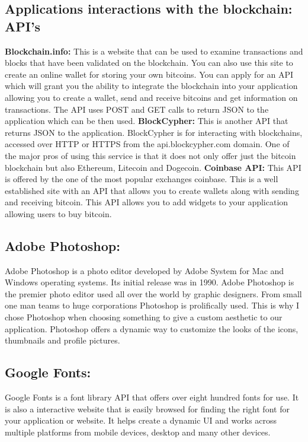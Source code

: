 \subsection{Applications interactions with the blockchain: API's}
\textbf{Blockchain.info:} This is a website that can be used to examine transactions and blocks that have been validated on the blockchain. You can also use this site to create an online wallet for storing your own bitcoins. You can apply for an API which will grant you the ability to integrate the blockchain into your application allowing you to create a wallet, send and receive bitcoins and get information on transactions. The API uses POST and GET calls to return JSON to the application which can be then used. \break
\textbf{BlockCypher:} This is another API that returns JSON to the application. BlockCypher is for interacting with blockchains, accessed over HTTP or HTTPS from the api.blockcypher.com domain. One of the major pros of using this service is that it does not only offer just the bitcoin blockchain but also Ethereum, Litecoin and Dogecoin. \break
\textbf{Coinbase API:} This API is offered by the one of the most popular exchanges coinbase. This is a well established site with an API that allows you to create wallets along with sending and receiving bitcoin. This API allows you to add widgets to your application allowing users to buy bitcoin.

\subsection{Adobe Photoshop:}
Adobe Photoshop is a photo editor developed by Adobe System for Mac and Windows operating systems. Its initial release was in 1990. Adobe Photoshop is the premier photo editor used all over the world by graphic designers. From small one man teams to huge corporations Photoshop is prolifically used. This is why I chose Photoshop when choosing something to give a custom aesthetic to our application. Photoshop offers a dynamic way to customize the looks of the icons, thumbnails and profile pictures. 

\subsection{Google Fonts:}
Google Fonts is a font library API that offers over eight hundred fonts for use. It is also a interactive website that is easily browsed for finding the right font for your application or website. It helps create a dynamic UI and works across multiple platforms from mobile devices, desktop and many other devices.

